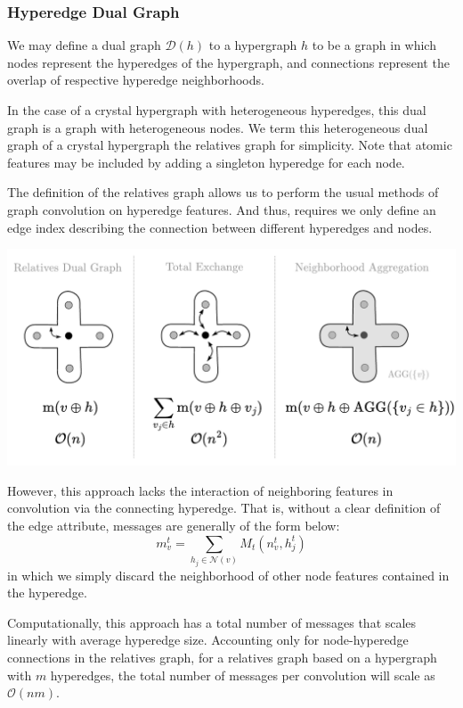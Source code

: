 \documentclass[10pt,a4paper]{article}
\begin{document}

\subsubsection{Hyperedge Dual Graph}
We may define a dual graph $\mathcal{D}(h)$ to a hypergraph $h$ to be a graph in which nodes represent the hyperedges of the hypergraph, and connections represent the overlap of respective hyperedge neighborhoods. 

In the case of a crystal hypergraph with heterogeneous hyperedges, this dual graph is a graph with heterogeneous nodes. We term this heterogeneous dual graph of a crystal hypergraph the relatives graph for simplicity. 
Note that atomic features may be included by adding a singleton hyperedge for each node.

The definition of the relatives graph allows us to perform the usual methods of graph convolution on hyperedge features. And thus, requires we only define an edge index describing the connection between different hyperedges and nodes.

\begin{center}
\includegraphics[scale=.75]{HMPNN.pdf}
\end{center}
However, this approach lacks the interaction of neighboring features in convolution via the connecting hyperedge. That is, without a clear definition of the edge attribute, messages are generally of the form below:
$$
m_v^{t} = \sum_{h_j\in \mathcal{N}(v)}M_t(n_v^{t},h_j^{t})
$$
in which we simply discard the neighborhood of other node features contained in the hyperedge.

Computationally, this approach has a total number of messages that scales linearly with average hyperedge size.
Accounting only for node-hyperedge connections in the relatives graph, for a relatives graph based on a hypergraph with $m$ hyperedges, the total number of messages per convolution will scale as $\mathcal{O}(nm)$.
 
\end{document}
